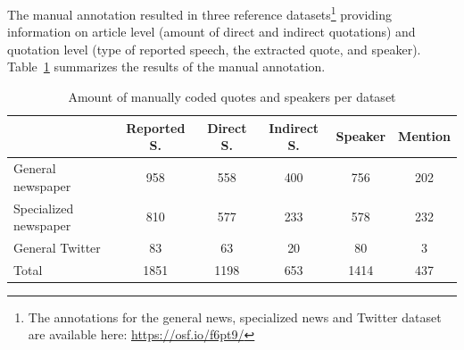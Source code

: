 \documentclass{ccr}
\begin{document}
The manual annotation resulted in three reference datasets\footnote{The annotations for the general news, specialized news and Twitter dataset are available here: \url{https://osf.io/f6pt9/}} providing information on article level (amount of direct and indirect
quotations) and quotation level (type of reported speech, the extracted
quote, and speaker). Table~\ref{tab:manual} summarizes the results of the manual
annotation.
\begin{table}[t]
    \centering
        \caption{Amount of manually coded quotes and speakers per dataset}
    \label{tab:manual}
    \begin{tabularx}{\textwidth}{Xccccc}
    \toprule
    & Reported S. & Direct S. & Indirect S. & Speaker & {Mention}\\
    \midrule
    General newspaper & 958&558 & 400 & 756 & 202 \\
    Specialized newspaper & 810 & 577 & 233 & 578 & 232 \\
    General Twitter & 83 & 63 & 20 & 80 & 3 \\
    \midrule
   Total & 1851 & 1198 & 653 & 1414 & 437  \\
    \bottomrule
    \end{tabularx}
    \raggedright\footnotesize{}

\end{table}
\end{document}
